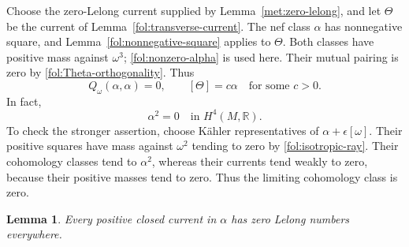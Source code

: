 \documentclass[11pt,letterpaper]{article}
\newtheorem{lemma}[theorem]{Lemma}
\theoremstyle{definition}
\theoremstyle{remark}
\begin{document}
Choose the zero-Lelong current supplied by
Lemma~\ref{met:zero-lelong}, and let $\Theta$ be the current of
Lemma~\ref{fol:transverse-current}.  The nef class $\alpha$ has
nonnegative square, and Lemma~\ref{fol:nonnegative-square} applies to
$\Theta$.  Both classes have positive mass against $\omega^3$;
\eqref{fol:nonzero-alpha} is used here.  Their mutual pairing is zero by
\eqref{fol:Theta-orthogonality}.  Thus
\begin{equation}\label{fol:isotropic-ray}
 Q_\omega(\alpha,\alpha)=0,\qquad [\Theta]=c\alpha
 \quad\text{for some }c>0.
\end{equation}
In fact,
\begin{equation}\label{fol:alpha-square-zero}
 \alpha^2=0\quad\text{in }H^4(M,\mathbb{R}).
\end{equation}
To check the stronger assertion, choose K\"ahler representatives of
$\alpha+\epsilon[\omega]$.  Their positive squares have mass against
$\omega^2$ tending to zero by \eqref{fol:isotropic-ray}.  Their
cohomology classes tend to $\alpha^2$, whereas their currents tend
weakly to zero, because their positive masses tend to zero.  Thus the
limiting cohomology class is zero.

\begin{lemma}\label{fol:all-zero-Lelong}
Every positive closed current in $\alpha$ has zero Lelong numbers
everywhere.
\end{lemma}
\end{document}
